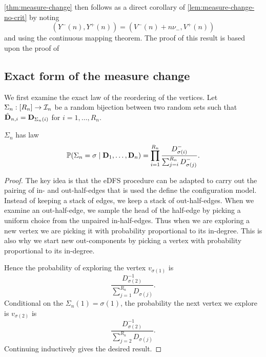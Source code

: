 \cref{thm:measure-change} then follows as a direct corollary of \cref{lem:measure-change-no-crit} by noting
\begin{equation*}
    \left( 
        Y^-(n), Y^+(n)
     \right) =
    \left( 
        V^-(n) + n \nu_-, V^+(n)
     \right)
\end{equation*}
and using the continuous mapping theorem. The proof of this result is based upon the proof of \cite[Lemma~6.7]{conchon--kerjanStableGraphMetric2020}

\subsection{Exact form of the measure change}

We first examine the exact law of the reordering of the vertices. Let $\Sigma_n: [R_n] \to {\mathcal I}_n$ be a random bijection between two random sets such that $\hat{{\mathbf D}}_{n, i} = {\mathbf D}_{\Sigma_n(i)}$ for $i = 1, \ldots, R_n$.

\begin{lemma}
    $\Sigma_n$ has law
    \begin{equation*}
        {\mathbb P}(\Sigma_n = \sigma \mid {\mathbf D}_1, \ldots, {\mathbf D}_n)
        = \prod_{i=1}^{R_n} \frac{D^-_{\sigma(i)}}{\sum_{j=i}^{R_n} D^-_{\sigma(j)}}.
    \end{equation*}
\end{lemma}
\begin{proof}
    The key idea is that the eDFS procedure can be adapted to carry out the pairing of in- and out-half-edges that is used the define the configuration model. Instead of keeping a stack of edges, we keep a stack of out-half-edges. When we examine an out-half-edge, we sample the head of the half-edge by picking a uniform choice from the unpaired in-half-edges. Thus when we are exploring a new vertex we are picking it with probability proportional to its in-degree. This is also why we start new out-components by picking a vertex with probability proportional to its in-degree.

    Hence the probability of exploring the vertex $v_{\sigma(1)}$ is
    \begin{equation*}
        \frac{D_{\sigma(2)}^{-1}}{\sum_{j=1}^{R_n} D_{\sigma(j)}}.
    \end{equation*}
    Conditional on the $\Sigma_n(1) = \sigma(1)$, the probability the next vertex we explore is $v_{\sigma(2)}$ is
    \begin{equation*}
        \frac{D_{\sigma(2)}^{-1}}{\sum_{j=2}^{R_n} D_{\sigma(j)}}.
    \end{equation*}
    Continuing inductively gives the desired result.
\end{proof}

